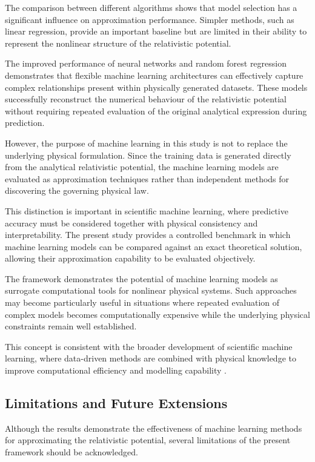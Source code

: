 \documentclass[
]{article}
\begin{document}
The comparison between different algorithms shows that model selection
has a significant influence on approximation performance. Simpler
methods, such as linear regression, provide an important baseline but
are limited in their ability to represent the nonlinear structure of the
relativistic potential.

The improved performance of neural networks and random forest regression
demonstrates that flexible machine learning architectures can effectively
capture complex relationships present within physically generated
datasets. These models successfully reconstruct the numerical behaviour
of the relativistic potential without requiring repeated evaluation of
the original analytical expression during prediction.

However, the purpose of machine learning in this study is not to replace
the underlying physical formulation. Since the training data is generated
directly from the analytical relativistic potential, the machine learning
models are evaluated as approximation techniques rather than independent
methods for discovering the governing physical law.

This distinction is important in scientific machine learning, where
predictive accuracy must be considered together with physical
consistency and interpretability. The present study provides a controlled
benchmark in which machine learning models can be compared against an
exact theoretical solution, allowing their approximation capability to be
evaluated objectively.

The framework demonstrates the potential of machine learning models as
surrogate computational tools for nonlinear physical systems. Such
approaches may become particularly useful in situations where repeated
evaluation of complex models becomes computationally expensive while the
underlying physical constraints remain well established.

This concept is consistent with the broader development of scientific
machine learning, where data-driven methods are combined with physical
knowledge to improve computational efficiency and modelling capability
\cite{karniadakis2021}.

\subsection{Limitations and Future Extensions}\label{limitations-and-future-extensions}

Although the results demonstrate the effectiveness of machine learning
methods for approximating the relativistic potential, several
limitations of the present framework should be acknowledged.
\end{document}
